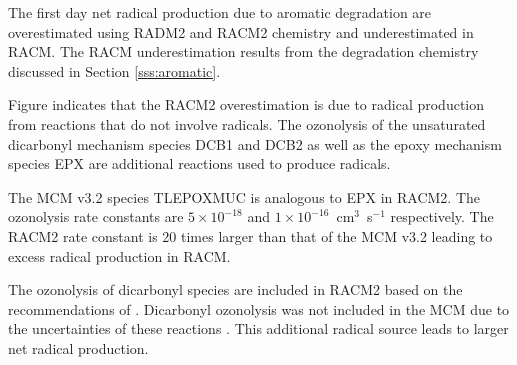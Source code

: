 The first day net radical production due to aromatic degradation are overestimated using RADM2 and RACM2 chemistry and underestimated in RACM. 
The RACM underestimation results from the degradation chemistry discussed in Section \ref{sss:aromatic}.

Figure indicates that the RACM2 overestimation is due to radical production from reactions that do not involve radicals. 
The ozonolysis of the unsaturated dicarbonyl mechanism species DCB1 and DCB2 as well as the epoxy mechanism species EPX are additional reactions used to produce radicals.

The MCM v3.2 species TLEPOXMUC is analogous to EPX in RACM2. 
The ozonolysis rate constants are \mbox{$5 \times 10^{-18}$} and \mbox{$1 \times 10^{-16}$ cm$^3$ s$^{-1}$} respectively. 
The RACM2 rate constant is 20 times larger than that of the MCM v3.2 leading to excess radical production in RACM.

The ozonolysis of dicarbonyl species are included in RACM2 based on the recommendations of \citet{Bierbach:1994}. 
Dicarbonyl ozonolysis was not included in the MCM due to the uncertainties of these reactions \citep{Bloss:2005}.  
This additional radical source leads to larger net radical production.

